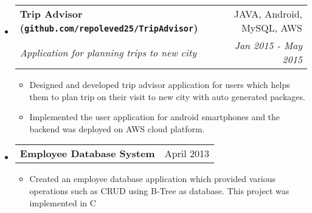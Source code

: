 \documentclass[letterpaper,11pt]{article}
\makeatletter
\newcommand{\resitem}[1]{\item #1 \vspace{-2pt}}
\newcommand{\ressubheading}[4]{
\begin{tabular*}{6.5in}{l@{\cftdotfill{\cftsecdotsep}\extracolsep{\fill}}r}
		\textbf{#1} & #2 \\
		\textit{#3} & \textit{#4} \\
\end{tabular*}\vspace{-6pt}}
\newcommand{\ressubheadingtwo}[2]{
\begin{tabular*}{6.5in}{l@{\cftdotfill{\cftsecdotsep}\extracolsep{\fill}}r}
	\textbf{#1} & #2 \\
\end{tabular*}\vspace{-6pt}}
\makeatother
\begin{document}
\begin{itemize}

\item
    \ressubheading{Trip Advisor (\texttt{github.com/repoleved25/TripAdvisor})}{JAVA, Android, MySQL, AWS}{Application for planning trips to new city}{Jan 2015 - May 2015}
    \begin{itemize}
        \resitem{Designed and developed trip advisor application for users which helps them to plan trip on their visit to new city with auto generated packages.}
	\resitem{Implemented the user application for android smartphones and the backend was deployed on AWS cloud platform.}
        \end{itemize}
        
\item
	\ressubheadingtwo{Employee Database System} {April 2013}
	\begin{itemize}
	      	\resitem{Created an employee database application which provided various operations such as CRUD using B-Tree as database. This project was implemented in C}
	\end{itemize}


\begin{comment}

\item
    \ressubheading{MOE: Metric Optimization Engine (\texttt{github.com/Yelp/MOE})}{Python, C++, CUDA}{A global, black box optimization engine for real world metric optimization}{2010 - Current}
    \begin{itemize}
        \resitem{Implemented throughout Yelp, optimizing ad metrics. 2nd most popular open source project.}
        \resitem{Talk: \texttt{bit.ly/1plYZA2}, Slides: \texttt{slidesha.re/1zOrOJy}, Blog: \texttt{bit.ly/1x73xdr}}
        \resitem{Presented to executives, universities, conferences and companies around the country.}
	\end{itemize}

\item
    \ressubheading{My Resume/CV (\texttt{github.com/sc932/resume})}{\LaTeX}{This resume and my CV.}{2010 - current}
    \begin{itemize}
        \resitem{280+ GitHub stars, previous \#1 article on Hacker News, 60+ forks.}
	\end{itemize}

\item
    \ressubheading{ALE: Assembly Likelihood Estimator (\texttt{github.com/sc932/ALE})}{C, Python}{Probabilistic evaluation of genome assemblies}{2010 - 2013}
    \begin{itemize}
        \resitem{Uses statistical function to score and rank genome assemblies, published in Bioinformatics}
	\end{itemize}
	
\end{comment}

\end{itemize}
\end{document}
